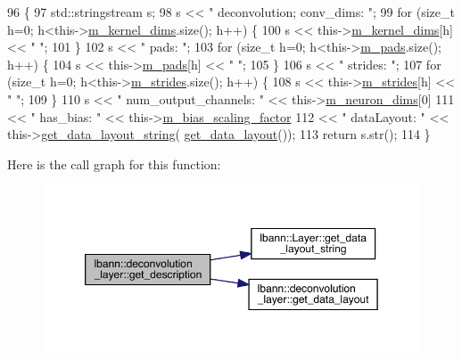\begin{DoxyCode}
96                                              \{
97     std::stringstream s;
98     s << \textcolor{stringliteral}{" deconvolution; conv\_dims: "};
99     \textcolor{keywordflow}{for} (\textcolor{keywordtype}{size\_t} h=0; h<this->\hyperlink{classlbann_1_1base__convolution__layer_a283edb6a476f975e713d0b4235ac658f}{m\_kernel\_dims}.size(); h++) \{
100       s << this->\hyperlink{classlbann_1_1base__convolution__layer_a283edb6a476f975e713d0b4235ac658f}{m\_kernel\_dims}[h] << \textcolor{stringliteral}{" "};
101     \}
102     s << \textcolor{stringliteral}{" pads: "};
103     \textcolor{keywordflow}{for} (\textcolor{keywordtype}{size\_t} h=0; h<this->\hyperlink{classlbann_1_1base__convolution__layer_a9732a8a0170a413bf0cde0128ad2a571}{m\_pads}.size(); h++) \{
104       s << this->\hyperlink{classlbann_1_1base__convolution__layer_a9732a8a0170a413bf0cde0128ad2a571}{m\_pads}[h] << \textcolor{stringliteral}{" "};
105     \}
106     s << \textcolor{stringliteral}{" strides: "};
107     \textcolor{keywordflow}{for} (\textcolor{keywordtype}{size\_t} h=0; h<this->\hyperlink{classlbann_1_1base__convolution__layer_a2429495822363e41f1f6b96a6b430445}{m\_strides}.size(); h++) \{
108       s << this->\hyperlink{classlbann_1_1base__convolution__layer_a2429495822363e41f1f6b96a6b430445}{m\_strides}[h] << \textcolor{stringliteral}{" "};
109     \}
110     s << \textcolor{stringliteral}{" num\_output\_channels: "} << this->\hyperlink{classlbann_1_1Layer_abb34bb8031f57a483e2e327a5f229f48}{m\_neuron\_dims}[0]
111       << \textcolor{stringliteral}{" has\_bias: "} << this->\hyperlink{classlbann_1_1base__convolution__layer_a5abe0bcd128b66a41fa481b28a9c2104}{m\_bias\_scaling\_factor}
112       << \textcolor{stringliteral}{" dataLayout: "} << this->\hyperlink{classlbann_1_1Layer_ae3f4a5602df821f4221614b1e3782dc1}{get\_data\_layout\_string}(
      \hyperlink{classlbann_1_1deconvolution__layer_a43249c72b440db8b5a1a7f2735c6a118}{get\_data\_layout}());
113     \textcolor{keywordflow}{return} s.str();
114   \}
\end{DoxyCode}
Here is the call graph for this function\+:\nopagebreak
\begin{figure}[H]
\begin{center}
\leavevmode
\includegraphics[width=350pt]{classlbann_1_1deconvolution__layer_a07f211e08383fe8e26b6e1b916136b67_cgraph}
\end{center}
\end{figure}
